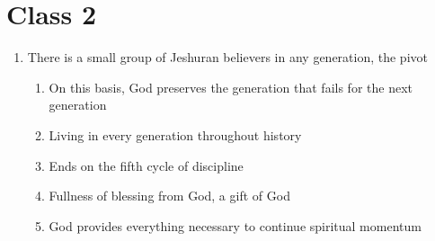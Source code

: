 \documentclass[11pt]{article}
\begin{document}
\section*{Class 2}
\begin{enumerate}
	\item There is a small group of Jeshuran believers in any generation, the pivot
	\begin{enumerate}
		\item On this basis, God preserves the generation that fails for the next generation
		\item Living in every generation throughout history
		\item Ends on the fifth cycle of discipline
		\item Fullness of blessing from God, a gift of God
		\item God provides everything necessary to continue spiritual momentum
		

\end{enumerate}
\end{enumerate}
\end{document}
